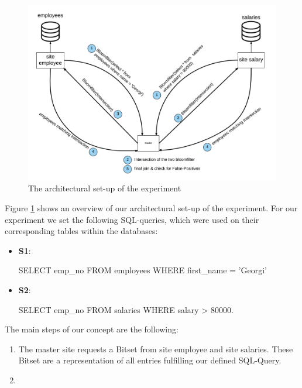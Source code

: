 \documentclass[12]{scrartcl}
\begin{document}
\begin{figure}[ht]
	\begin{center}
		\includegraphics[scale=0.1]{res/architecture.png}
	\end{center}
	\caption{The architectural set-up of the experiment}
	\label{fig:architecture}
\end{figure}

Figure \ref{fig:architecture} shows an overview of our architectural set-up of the experiment. For our experiment we set the following SQL-queries, which were used on their corresponding tables within the databases:

\begin{itemize}
	\item[]  \textbf{S1}: \begin{verb}
	SELECT emp_no FROM employees WHERE first_name = 'Georgi'
	\end{verb}
	\item[]  \textbf{S2}: \begin{verb}
		SELECT emp_no FROM salaries WHERE salary > 80000.
	\end{verb}
\end{itemize}



The main steps of our concept are the following:
\begin{enumerate}
	\item The master site requests a Bitset from site employee and site salaries. These Bitset are a representation of all entries fulfilling our defined SQL-Query.
	\item 
\end{enumerate}
\end{document}
